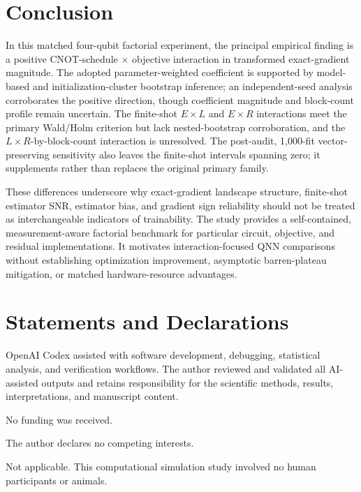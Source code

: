 \documentclass[pdflatex,sn-mathphys-num,Numbered]{sn-jnl}
\begin{document}
\section{Conclusion}\label{sec:conclusion}

In this matched four-qubit factorial experiment, the principal empirical finding is a positive CNOT-schedule $\times$ objective interaction in transformed exact-gradient magnitude. The adopted parameter-weighted coefficient is supported by model-based and initialization-cluster bootstrap inference; an independent-seed analysis corroborates the positive direction, though coefficient magnitude and block-count profile remain uncertain. The finite-shot $E\times L$ and $E\times R$ interactions meet the primary Wald/Holm criterion but lack nested-bootstrap corroboration, and the $L\times R$-by-block-count interaction is unresolved. The post-audit, 1,000-fit vector-preserving sensitivity also leaves the finite-shot intervals spanning zero; it supplements rather than replaces the original primary family.

These differences underscore why exact-gradient landscape structure, finite-shot estimator SNR, estimator bias, and gradient sign reliability should not be treated as interchangeable indicators of trainability. The study provides a self-contained, measurement-aware factorial benchmark for particular circuit, objective, and residual implementations. It motivates interaction-focused QNN comparisons without establishing optimization improvement, asymptotic barren-plateau mitigation, or matched hardware-resource advantages.

\backmatter

\section*{Statements and Declarations}

 OpenAI Codex assisted with software development, debugging, statistical analysis, and verification workflows. The author reviewed and validated all AI-assisted outputs and retains responsibility for the scientific methods, results, interpretations, and manuscript content.

 No funding was received.

 The author declares no competing interests.

 Not applicable. This computational simulation study involved no human participants or animals.
\end{document}

